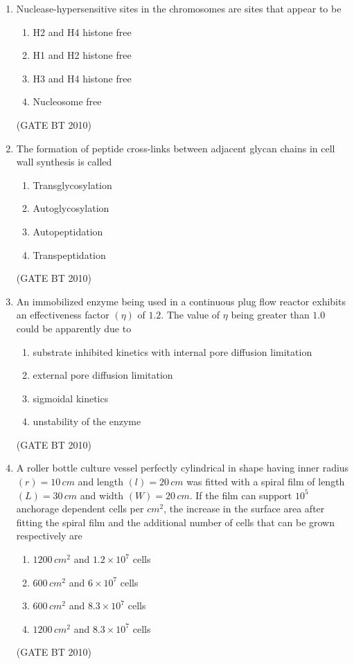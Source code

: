 \documentclass[journal,12pt,onecolumn]{IEEEtran}
\theoremstyle{remark}
\begin{document}
\begin{enumerate}
\item Nuclease-hypersensitive sites in the chromosomes are sites that appear to be  
\begin{enumerate}
   \item H2 and H4 histone free  
   \item H1 and H2 histone free  
   \item H3 and H4 histone free  
   \item Nucleosome free  
\end{enumerate}
\hfill (GATE BT 2010)

\item The formation of peptide cross-links between adjacent glycan chains in cell wall synthesis is called  
\begin{enumerate}
   \item Transglycosylation  
   \item Autoglycosylation  
   \item Autopeptidation  
   \item Transpeptidation  
\end{enumerate}
\hfill (GATE BT 2010)

\item An immobilized enzyme being used in a continuous plug flow reactor exhibits an effectiveness factor $(\eta)$ of $1.2$. The value of $\eta$ being greater than $1.0$ could be apparently due to  
\begin{enumerate}
   \item substrate inhibited kinetics with internal pore diffusion limitation  
   \item external pore diffusion limitation  
   \item sigmoidal kinetics  
   \item unstability of the enzyme  
\end{enumerate}
\hfill (GATE BT 2010)

\item A roller bottle culture vessel perfectly cylindrical in shape having inner radius $(r) = 10 \, cm$ and length $(l) = 20 \, cm$ was fitted with a spiral film of length $(L) = 30 \, cm$ and width $(W) = 20 \, cm$. If the film can support $10^5$ anchorage dependent cells per $cm^2$, the increase in the surface area after fitting the spiral film and the additional number of cells that can be grown respectively are  
\begin{enumerate}
\item $1200 \, cm^2$ and $1.2 \times 10^7$ cells  
\item $600 \, cm^2$ and $6 \times 10^7$ cells  
\item $600 \, cm^2$ and $8.3 \times 10^7$ cells  
\item $1200 \, cm^2$ and $8.3 \times 10^7$ cells  
\end{enumerate}
\hfill (GATE BT 2010)



\end{enumerate}
\end{document}
